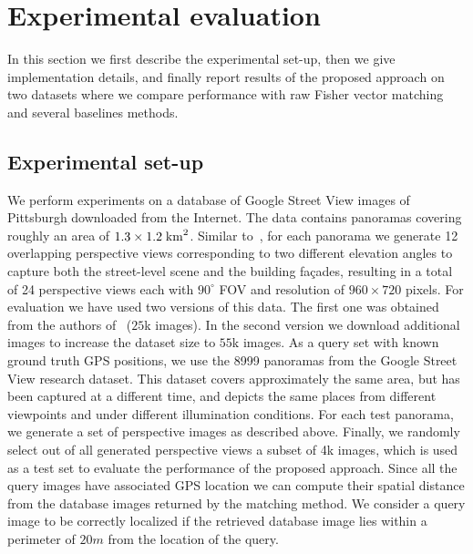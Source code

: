 \documentclass[10pt,twocolumn,letterpaper]{article}
\begin{document}
\section{Experimental evaluation}
\label{sec:exp}
   In this section we first describe the experimental set-up, then we give implementation details, and finally report results of the proposed approach on two datasets where we compare performance with raw Fisher vector matching and several baselines methods. 

   \subsection{Experimental set-up}
      We perform experiments on a database of Google Street View images of Pittsburgh downloaded from the Internet. The data contains panoramas covering roughly an area of $1.3 \times 1.2 \; {\rm km}^2$.       
      Similar to~\cite{Chen11}, for each panorama we generate 12 overlapping perspective views corresponding to two different elevation angles to capture both the street-level scene and the building fa\c{c}ades, resulting in a total of 24 perspective views each with $90^\circ$ FOV and resolution of $960 \times 720$ pixels.
      For evaluation we have used two versions of this data. The first one was obtained from the authors of~\cite{Gronat13} ($25$k images). In the second version we download additional images to increase the dataset size to $55$k images. 
      As a query set with known ground truth GPS positions, we use the 8999 panoramas from the Google Street View research dataset. This dataset covers approximately the same area, but has been captured at a different time, and depicts the same places from different viewpoints and under different illumination conditions. For each test panorama, we generate a set of perspective images as described above. Finally, we randomly select out of all generated perspective views a subset of 4k images, which is used as a test set to evaluate the performance of the proposed approach.
      Since all the query images have associated GPS location we can compute their spatial distance from the database images returned by the matching method. We consider a query image to be correctly localized if the retrieved database image lies within a perimeter of $20m$ from the location of the query.
\end{document}

